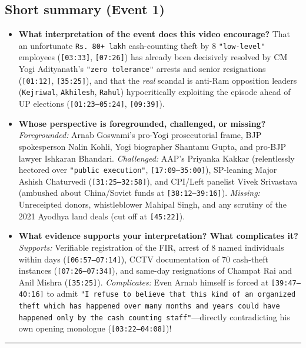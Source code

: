 \documentclass[10pt,a4paper]{article}
\begin{document}
\subsection*{Short summary (Event 1)}
\begin{itemize}[leftmargin=1.5em, itemsep=3pt, topsep=4pt]
  \item \textbf{What interpretation of the event does this video encourage?} That an unfortunate \texttt{Rs.\,80+ lakh} cash-counting theft by 8 \texttt{"low-level"} employees (\texttt{[03:33]}, \texttt{[07:26]}) has already been decisively resolved by CM Yogi Adityanath's \texttt{"zero tolerance"} arrests and senior resignations (\texttt{[01:12]}, \texttt{[35:25]}), and that the \textit{real} scandal is anti-Ram opposition leaders (\texttt{Kejriwal}, \texttt{Akhilesh}, \texttt{Rahul}) hypocritically exploiting the episode ahead of UP elections (\texttt{[01:23--05:24]}, \texttt{[09:39]}).
  \item \textbf{Whose perspective is foregrounded, challenged, or missing?} \textit{Foregrounded:} Arnab Goswami's pro-Yogi prosecutorial frame, BJP spokesperson Nalin Kohli, Yogi biographer Shantanu Gupta, and pro-BJP lawyer Ishkaran Bhandari. \textit{Challenged:} AAP's Priyanka Kakkar (relentlessly hectored over \texttt{"public execution"}, \texttt{[17:09--35:00]}), SP-leaning Major Ashish Chaturvedi (\texttt{[31:25--32:58]}), and CPI/Left panelist Vivek Srivastava (ambushed about China/Soviet funds at \texttt{[38:12--39:16]}). \textit{Missing:} Unreceipted donors, whistleblower Mahipal Singh, and any scrutiny of the 2021 Ayodhya land deals (cut off at \texttt{[45:22]}).
  \item \textbf{What evidence supports your interpretation? What complicates it?} \textit{Supports:} Verifiable registration of the FIR, arrest of 8 named individuals within days (\texttt{[06:57--07:14]}), CCTV documentation of 70 cash-theft instances (\texttt{[07:26--07:34]}), and same-day resignations of Champat Rai and Anil Mishra (\texttt{[35:25]}). \textit{Complicates:} Even Arnab himself is forced at \texttt{[39:47--40:16]} to admit \texttt{"I refuse to believe that this kind of an organized theft which has happened over many months and years could have happened only by the cash counting staff"}---directly contradicting his own opening monologue (\texttt{[03:22--04:08]})!
\end{itemize}
\vspace{4pt}\noindent\rule{\textwidth}{0.4pt}\vspace{4pt}
\end{document}

